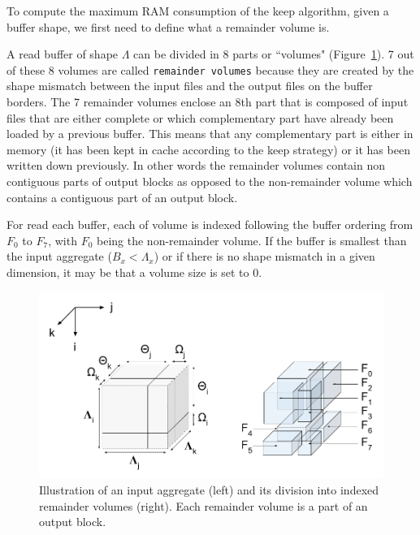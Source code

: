 \documentclass[sigconf, nonacm]{acmart}
\begin{document}
To compute the maximum RAM consumption of the keep algorithm, given a
buffer shape, we first need to define what a remainder volume is.

A read buffer of shape $\Lambda$ can be divided in
8 parts or ``volumes" (Figure~\ref{fig:nomenclature_overlaps}).
7 out of these 8 volumes are called \texttt{remainder volumes} because
they are created by the shape mismatch between the input files and the output files on
the buffer borders.
The 7 remainder volumes enclose an 8th part that is composed of
input files that are either complete or which complementary part have already
been loaded by a previous buffer. This means that any complementary part is either
in memory (it has been kept in cache according to the keep strategy) or it has
been written down previously.
In other words the remainder volumes contain non contiguous parts of output blocks
as opposed to the non-remainder volume which contains a contiguous part of
an output block.

For read each buffer, each of volume
is indexed following the buffer ordering from $F_0$ to $F_7$, with $F_0$ being the
non-remainder volume. If the buffer is smallest than the input aggregate
($B_x<\Lambda_x$) or if there is no shape mismatch in a given dimension,
it may be that a volume size is set to 0.

\begin{figure}[h]
\centering
\includegraphics[scale=0.4]{./figures/new/figure_3.png}
\caption{Illustration of an input aggregate (left) and its division into indexed remainder volumes (right).
Each remainder volume is a part of an output block.}
\label{fig:nomenclature_overlaps}
\end{figure}
\end{document}
